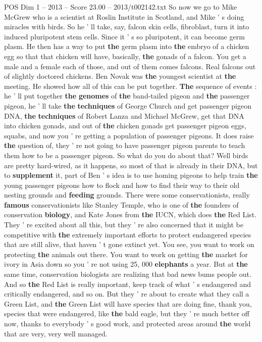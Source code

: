 \begin{textsample}{POS Dim 1 – 2013 – Score 23.00 – 2013/t002142.txt}
So now we go to Mike McGrew who is a scientist at Roslin Institute in Scotland, and Mike ' s doing miracles with birds.
So he ' ll take, say, falcon skin cells, fibroblast, turn it into induced pluripotent stem cells.
Since it ' s so pluripotent, it can become germ plasm.
He then has a way to put \textbf{the} germ plasm into \textbf{the} embryo of a chicken egg so that that chicken will have, basically, \textbf{the} gonads of a falcon.
You get a male and a female each of those, and out of them comes falcons.
Real falcons out of slightly doctored chickens.
Ben Novak was \textbf{the} youngest scientist at \textbf{the} meeting.
He showed how all of this can be put together. \textbf{The} sequence of events : he ' ll put together \textbf{the} \textbf{genomes} of \textbf{the} band-tailed pigeon and \textbf{the} passenger pigeon, he ' ll take \textbf{the} \textbf{techniques} of George Church and get passenger pigeon DNA, \textbf{the} \textbf{techniques} of Robert Lanza and Michael McGrew, get that DNA into chicken gonads, and out of \textbf{the} chicken gonads get passenger pigeon eggs, squabs, and now you ' re getting a population of passenger pigeons.
It does raise \textbf{the} question of, they ' re not going to have passenger pigeon parents to teach them how to be a passenger pigeon.
So what do you do about that?
Well birds are pretty hard-wired, as it happens, so most of that is already in their DNA, but to \textbf{supplement} it, part of Ben ' s idea is to use homing pigeons to help train \textbf{the} young passenger pigeons how to flock and how to find their way to their old nesting grounds and \textbf{feeding} grounds.
There were some conservationists, really \textbf{famous} conservationists like Stanley Temple, who is one of \textbf{the} founders of conservation \textbf{biology}, and Kate Jones from \textbf{the} IUCN, which does \textbf{the} Red List.
They ' re excited about all this, but they ' re also concerned that it might be competitive with \textbf{the} extremely important efforts to protect endangered species that are still alive, that haven ' t gone extinct yet.
You see, you want to work on protecting \textbf{the} animals out there.
You want to work on getting \textbf{the} market for ivory in Asia down so you ' re not using 25, 000 \textbf{elephants} a year.
But at \textbf{the} same time, conservation biologists are realizing that bad news bums people out.
And so \textbf{the} Red List is really important, keep track of what ' s endangered and critically endangered, and so on.
But they ' re about to create what they call a Green List, and \textbf{the} Green List will have species that are doing fine, thank you, species that were endangered, like \textbf{the} bald eagle, but they ' re much better off now, thanks to everybody ' s good work, and protected areas around \textbf{the} world that are very, very well managed.

\end{textsample}
